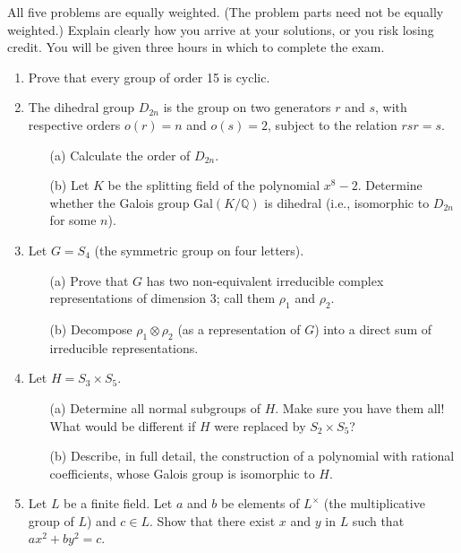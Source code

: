 \documentclass{article}
\begin{document}
All five problems are equally weighted. (The problem parts need not be equally weighted.) Explain clearly how you arrive at your solutions, or you risk losing credit. You will be given three hours in which to complete the exam.

\begin{enumerate}
    \item Prove that every group of order 15 is cyclic.

    \item The dihedral group \(D_{2n}\) is the group on two generators \(r\) and \(s\), with respective orders \(o(r)=n\) and \(o(s)=2\), subject to the relation \(rsr=s\).
    \begin{itemize}
        \item[(a)] Calculate the order of \(D_{2n}\).
        \item[(b)] Let \(K\) be the splitting field of the polynomial \(x^8 - 2\). Determine whether the Galois group \(\text{Gal}(K/\mathbb{Q})\) is dihedral (i.e., isomorphic to \(D_{2n}\) for some \(n\)).
    \end{itemize}

    \item Let \(G = S_4\) (the symmetric group on four letters).
    \begin{itemize}
        \item[(a)] Prove that \(G\) has two non-equivalent irreducible complex representations of dimension 3; call them \(\rho_1\) and \(\rho_2\).
        \item[(b)] Decompose \(\rho_1 \otimes \rho_2\) (as a representation of \(G\)) into a direct sum of irreducible representations.
    \end{itemize}

    \item Let \(H = S_3 \times S_5\).
    \begin{itemize}
        \item[(a)] Determine all normal subgroups of \(H\). Make sure you have them all! What would be different if \(H\) were replaced by \(S_2 \times S_5\)?
        \item[(b)] Describe, in full detail, the construction of a polynomial with rational coefficients, whose Galois group is isomorphic to \(H\).
    \end{itemize}

    \item Let \(L\) be a finite field. Let \(a\) and \(b\) be elements of \(L^\times\) (the multiplicative group of \(L\)) and \(c \in L\). Show that there exist \(x\) and \(y\) in \(L\) such that \(ax^2 + by^2 = c\).


\end{enumerate}
\end{document}
